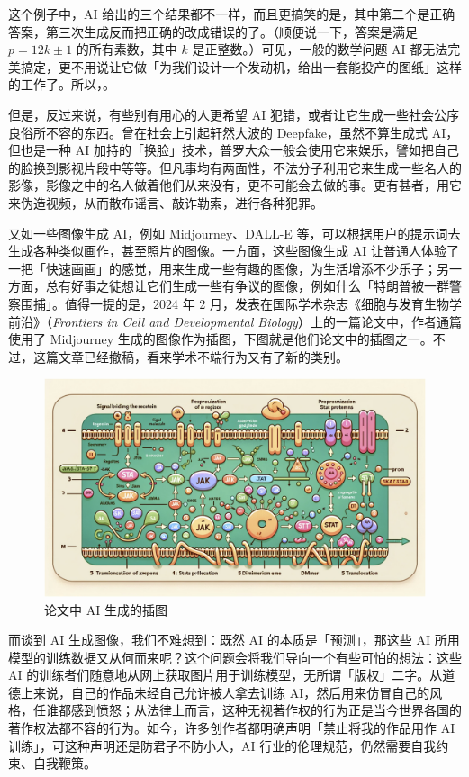 这个例子中，AI 给出的三个结果都不一样，而且更搞笑的是，其中第二个是正确答案，第三次生成反而把正确的改成错误的了。（顺便说一下，答案是满足 $p = 12k \pm 1$ 的所有素数，其中 $k$ 是正整数。）可见，一般的数学问题 AI 都无法完美搞定，更不用说让它做「为我们设计一个发动机，给出一套能投产的图纸」这样的工作了。所以，。

但是，反过来说，有些别有用心的人更希望 AI 犯错，或者让它生成一些社会公序良俗所不容的东西。曾在社会上引起轩然大波的 Deepfake，虽然不算生成式 AI，但也是一种 AI 加持的「换脸」技术，普罗大众一般会使用它来娱乐，譬如把自己的脸换到影视片段中等等。但凡事均有两面性，不法分子利用它来生成一些名人的影像，影像之中的名人做着他们从来没有，更不可能会去做的事。更有甚者，用它来伪造视频，从而散布谣言、敲诈勒索，进行各种犯罪。

又如一些图像生成 AI，例如 Midjourney、DALL-E 等，可以根据用户的提示词去生成各种类似画作，甚至照片的图像。一方面，这些图像生成 AI 让普通人体验了一把「快速画画」的感觉，用来生成一些有趣的图像，为生活增添不少乐子；另一方面，总有好事之徒想让它们生成一些有争议的图像，例如什么「特朗普被一群警察围捕」。值得一提的是，2024 年 2 月，发表在国际学术杂志《细胞与发育生物学前沿》（\textit{Frontiers in Cell and Developmental Biology}）上的一篇论文中，作者通篇使用了 Midjourney 生成的图像作为插图，下图就是他们论文中的插图之一。不过，这篇文章已经撤稿，看来学术不端行为又有了新的类别。

\begin{figure}[htb!]
  \centering
  \includegraphics[width=.75\textwidth]{assets/surpass/FigureByMidjourney.jpg}
  \caption{论文中 AI 生成的插图}
  \label{fig:FigureByMidjourney}
\end{figure}

而谈到 AI 生成图像，我们不难想到：既然 AI 的本质是「预测」，那这些 AI 所用模型的训练数据又从何而来呢？这个问题会将我们导向一个有些可怕的想法：这些 AI 的训练者们随意地从网上获取图片用于训练模型，无所谓「版权」二字。从道德上来说，自己的作品未经自己允许被人拿去训练 AI，然后用来仿冒自己的风格，任谁都感到愤怒；从法律上而言，这种无视著作权的行为正是当今世界各国的著作权法都不容的行为。如今，许多创作者都明确声明「禁止将我的作品用作 AI 训练」，可这种声明还是防君子不防小人，AI 行业的伦理规范，仍然需要自我约束、自我鞭策。

